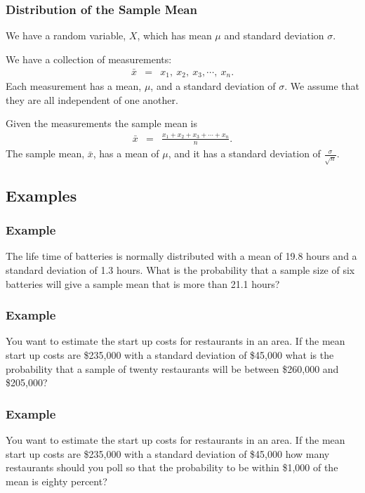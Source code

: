 \begin{frame}
  \frametitle{Distribution of the Sample Mean}

  We have a random variable, $X$, which has mean $\mu$ and standard
  deviation $\sigma.$

  We have a collection of measurements:
  \begin{eqnarray*}
    \bar{x} & = & x_1,~x_2,~x_3,\cdots,~x_n.
  \end{eqnarray*}
  Each measurement has a mean, $\mu$, and a standard deviation of
  $\sigma$. We assume that they are all independent of one another.
  
  Given the measurements the sample mean is
  \begin{eqnarray*}
    \bar{x} & = & \frac{x_1+x_2+x_3+\cdots+x_n}{n}.
  \end{eqnarray*}
  The sample mean, $\bar{x}$,  has a mean of $\mu$, and it has a
  standard deviation of $\frac{\sigma}{\sqrt{n}}$.

\end{frame}



\subsection{Examples}

\begin{frame}
  \frametitle{Example}

  The life time of batteries is normally distributed with a mean of
  19.8 hours and a standard deviation of 1.3 hours. What is the
  probability that a sample size of six batteries will give a sample
  mean that is more than 21.1 hours?

\end{frame}


\begin{frame}
  \frametitle{Example}

  You want to estimate the start up costs for restaurants in an
  area. If the mean start up costs are \$235,000 with a standard
  deviation of \$45,000 what is the probability that a sample of
  twenty restaurants will be between \$260,000 and \$205,000?

\end{frame}


\begin{frame}
  \frametitle{Example}

  You want to estimate the start up costs for restaurants in an
  area. If the mean start up costs are \$235,000 with a standard
  deviation of \$45,000 how many restaurants should you poll so that
  the probability to be within \$1,000 of the mean is eighty percent?

\end{frame}


